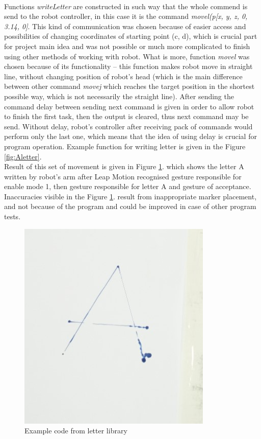 \mbox{}\\

Functions \textit{writeLetter} are constructed in such way that the whole commend is send to the robot controller, in this case it is the command \textit{movel(p[x, y, z, 0, 3.14, 0]}. This kind of communication was chosen because of easier access and possibilities of changing coordinates of starting point (c, d), which is crucial part for project main idea and was not possible or much more complicated to finish using other methods of working with robot. What is more, function \textit{movel} was chosen because of its functionality – this function makes robot move in straight line, without changing position of robot’s head (which is the main difference between other command \textit{movej} which reaches the target position in the shortest possible way, which is not necessarily the straight line). After sending the command delay between sending next command is given in order to allow robot to finish the first task, then the output is cleared, thus next command may be send. Without delay, robot’s controller after receiving pack of commands would perform only the last one, which means that the idea of using delay is crucial for program operation.  Example function for writing letter is given in the Figure \ref{fig:Aletter}. \\

Result of this set of movement is given in Figure \ref{fig:letter}. which shows the letter A written by robot’s arm after Leap Motion recognised gesture responsible for enable mode 1, then gesture responsible for letter A and gesture of acceptance. Inaccuracies visible in the Figure  \ref{fig:letter}. result from inappropriate marker placement, and not because of the program and could be improved in case of other program tests. \\

\begin{figure}[H]
	\includegraphics{Letter}
	\centering
	\caption{Example code from letter library}
	\label{fig:letter}
\end{figure}

